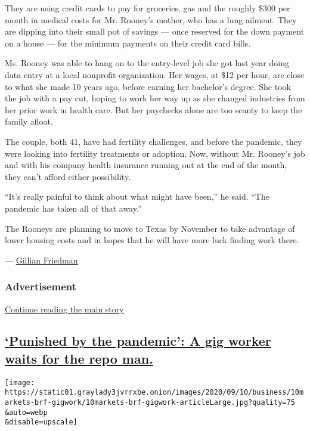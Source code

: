 They are using credit cards to pay for groceries, gas and the roughly
\$300 per month in medical costs for Mr. Rooney's mother, who has a lung
ailment. They are dipping into their small pot of savings --- once
reserved for the down payment on a house --- for the minimum payments on
their credit card bills.

Ms. Rooney was able to hang on to the entry-level job she got last year
doing data entry at a local nonprofit organization. Her wages, at \$12
per hour, are close to what she made 10 years ago, before earning her
bachelor's degree. She took the job with a pay cut, hoping to work her
way up as she changed industries from her prior work in health care. But
her paychecks alone are too scanty to keep the family afloat.

The couple, both 41, have had fertility challenges, and before the
pandemic, they were looking into fertility treatments or adoption. Now,
without Mr. Rooney's job and with his company health insurance running
out at the end of the month, they can't afford either possibility.

``It's really painful to think about what might have been,'' he said.
``The pandemic has taken all of that away.''

The Rooneys are planning to move to Texas by November to take advantage
of lower housing costs and in hopes that he will have more luck finding
work there.

--- \href{http://nytimes3xbfgragh.onion/by/gillian-friedman}{Gillian
Friedman}

\hypertarget{advertisement-2}{%
\subsubsection{Advertisement}\label{advertisement-2}}

\protect\hyperlink{after-dfp-ad-mid3}{Continue reading the main story}

\hypertarget{punished-by-the-pandemic-a-gig-worker-waits-for-the-repo-man}{%
\subsection{\texorpdfstring{\protect\hyperlink{punished-by-the-pandemic-a-gig-worker-waits-for-the-repo-man}{`Punished
by the pandemic': A gig worker waits for the repo
man.}}{`Punished by the pandemic': A gig worker waits for the repo man.}}\label{punished-by-the-pandemic-a-gig-worker-waits-for-the-repo-man}}

\texttt{[image: https://static01.graylady3jvrrxbe.onion/images/2020/09/10/business/10markets-brf-gigwork/10markets-brf-gigwork-articleLarge.jpg?quality=75\\\&auto=webp\\\&disable=upscale]}

